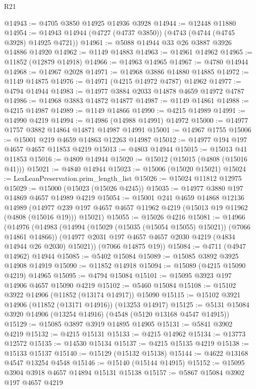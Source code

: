 \begin{lexlean}{R21}
\begin{coremodule}
@14943 := @4705 @3850 @14925 @14936 @3928
@14944 := @12448 @11880
@14954 := @14943 @14944 (@4727 (@4737 @3850)) (@4743 (@4744 (@4745 @3928) @14925 @4721))
@14961 := @5088 @14944 @33 @26 @3887 @3926 @14886 @14920
@14962 := @1149 @14883
@14963 := @14961 @14962
@14965 := @11852 (@12879 @14918)
@14966 := @14963 @14965
@14967 := @4780 @14944
@14968 := @14967 @2028
@14971 := @14968 @3886 @14880 @14885
@14972 := @1149 @14875
@14976 := @14971 (@4215 @14972 @4787) @14962
@14977 := @4794 @14944
@14983 := @14977 @3884 @2033 @14878 @4659 @14972 @4787
@14986 := @14968 @3883 @14872 @14877
@14987 := @1149 @14861
@14988 := @4215 @14987
@14989 := @1149 @14866
@14990 := @4215 @14989
@14991 := @14990 @4219
@14994 := @14986 (@14988 @14991) @14972
@15000 := @14977 @1757 @3882 @14864 @14871 @14987 @14991
@15001 := @14967 @1755
@15006 := @15001 @219 @4659 @14863 @12263 @14987
@15012 := @14977 @194 @197 @4657 @4657 @11853 @4219
@15013 := @4803 @14944
@15015 := @15013 @41 @11853
@15016 := @4809 @14944
@15020 := @15012 (@15015 (@4808 (@15016 @41)))
@15021 := @4840 @14944
@15023 := @15006 (@15020 @15021)
@15024 := LexLeanPreservation.prim_length_list
@15026 := @15024 @11812 @12975
@15029 := @15000 (@15023 (@15026 @4245))
@15035 := @14977 @3880 @197 @14869 @4657 @14989 @4219
@15054 := @15001
    @241
    @4659
    @14868
    @12136
    @14989
    (@14977 @239 @197 @4657 @4657 @11962 @4219 (@15013 @19 @11962 (@4808 (@15016 @19))) @15021)
@15055 := @15026 @4216
@15081 := @14966
    (@14976
      (@14983
        (@14994 (@15029 (@15035 (@15054 @15055) @15021)) (@7066 @14861 @14866))
        (@14977 @2031 @197 @4657 @4657 @2030 @4219 (@4834 @14944 @26 @2030) @15021))
      (@7066 @14875 @19))
@15084 := @4711 (@4947 @14962) @14944
@15085 := @5402 @15084
@15089 := @15085 @3892 @3925 @14908 @14919
@15090 := @11852 @14918
@15094 := @15089 (@4215 @15090 @4219) @14965
@15095 := @4794 @15084
@15101 := @15095 @3923 @197 @14906 @4657 @15090 @4219
@15102 := @5460 @15084
@15108 := @15102 @3922 @14906 (@11852 (@13174 @14917)) @15090
@15115 := @15102 @3921 @14906 (@11852 (@13171 @14916)) (@13253 @14917)
@15125 := @5131 @15084 @3920 @14906 (@13254 @14916) (@4548 (@5120 @13168 @4547 @14915))
@15129 := @15085 @3897 @3919 @14895 @14905
@15131 := @5841 @3902 @4219
@15132 := @4215 @15131
@15133 := @4215 @14962
@15134 := @13773 @12572
@15135 := @14530 @15134
@15137 := @4215 @15135 @4219
@15138 := @15133 @15137
@15140 := @15129 (@15132 @15138)
@15144 := @4622 @13168 @4547 @13254 @4548
@15146 := @15140 (@15144 @14915)
@15152 := @15095 @3904 @3918 @4657 @14894 @15131 @15138
@15157 := @5867 @15084 @3902 @197 @4657 @4219

\end{coremodule}
\end{lexlean}
